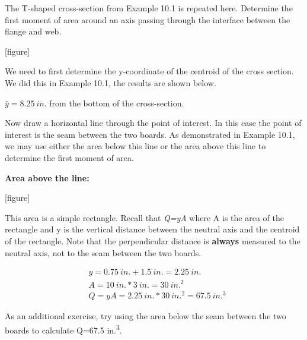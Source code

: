 \documentclass[
  letterpaper,
  DIV=11,
  numbers=noendperiod]{scrreprt}
\begin{document}
\begin{tcolorbox}[enhanced jigsaw, breakable, opacityback=0, toptitle=1mm, left=2mm, colback=white, opacitybacktitle=0.6, colframe=quarto-callout-tip-color-frame, titlerule=0mm, arc=.35mm, leftrule=.75mm, bottomtitle=1mm, colbacktitle=quarto-callout-tip-color!10!white, rightrule=.15mm, title={Example 10.2}, bottomrule=.15mm, toprule=.15mm, coltitle=black]

The T-shaped cross-section from Example 10.1 is repeated here. Determine
the first moment of area around an axis passing through the interface
between the flange and web.

{[}figure{]}

\begin{tcolorbox}[enhanced jigsaw, breakable, opacityback=0, toptitle=1mm, left=2mm, colback=white, opacitybacktitle=0.6, colframe=quarto-callout-tip-color-frame, titlerule=0mm, arc=.35mm, leftrule=.75mm, bottomtitle=1mm, colbacktitle=quarto-callout-tip-color!10!white, rightrule=.15mm, title={Solution}, bottomrule=.15mm, toprule=.15mm, coltitle=black]

We need to first determine the y-coordinate of the centroid of the cross
section. We did this in Example 10.1, the results are shown below.

\(\bar{y}=8.25{~in.}\) from the bottom of the cross-section.

Now draw a horizontal line through the point of interest. In this case
the point of interest is the seam between the two boards. As
demonstrated in Example 10.1, we may use either the area below this line
or the area above this line to determine the first moment of area.

\textbf{Area above the line:}

{[}figure{]}

This area is a simple rectangle. Recall that \emph{Q=yA} where A is the
area of the rectangle and y is the vertical distance between the neutral
axis and the centroid of the rectangle. Note that the perpendicular
distance is \textbf{always} measured to the neutral axis, not to the
seam between the two boards.

\[
\begin{aligned}
& y=0.75{~in.}+1.5{~in.}=2.25{~in.} \\
& A=10{~in.} * 3{~in.}=30{~in.}^2 \\
& Q=y A=2.25{~in.} * 30{~in.}^2=67.5{~in.}^3
\end{aligned}
\]

As an additional exercise, try using the area below the seam between the
two boards to calculate Q=67.5 in.\textsuperscript{3}.

\end{tcolorbox}

\end{tcolorbox}
\end{document}
